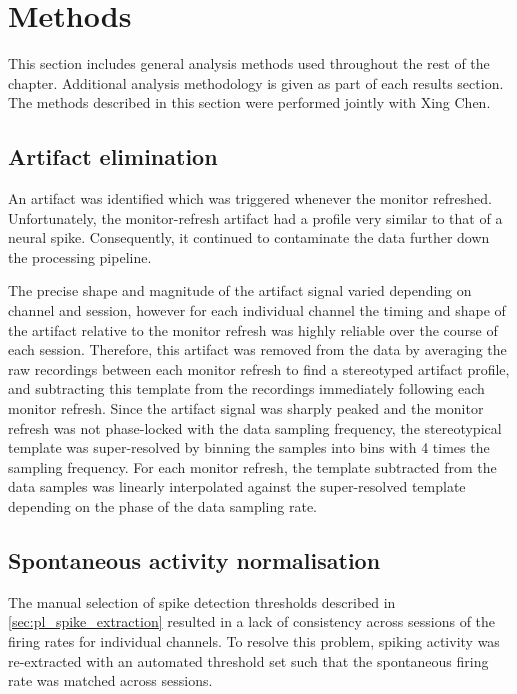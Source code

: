 \section{Methods}
\FloatBarrier

This section includes general analysis methods used throughout the rest of the chapter.
Additional analysis methodology is given as part of each results section.
The methods described in this section were performed jointly with Xing Chen.


\subsection{Artifact elimination}
\label{sec:pl_artifact_elimination}
\label{sec:ma}

An artifact was identified which was triggered whenever the monitor refreshed.
Unfortunately, the monitor-refresh artifact had a profile very similar to that of a neural spike.
Consequently, it continued to contaminate the data further down the processing pipeline.

The precise shape and magnitude of the artifact signal varied depending on channel and session, however for each individual channel the timing and shape of the artifact relative to the monitor refresh was highly reliable over the course of each session.
Therefore, this artifact was removed from the data by averaging the raw recordings between each monitor refresh to find a stereotyped artifact profile, and subtracting this template from the recordings immediately following each monitor refresh.
Since the artifact signal was sharply peaked and the monitor refresh was not phase-locked with the data sampling frequency, the stereotypical template was super-resolved by binning the samples into bins with 4 times the sampling frequency.
For each monitor refresh, the template subtracted from the data samples was linearly interpolated against the super-resolved template depending on the phase of the data sampling rate.


\subsection{Spontaneous activity normalisation}
\label{sec:pl_san}

The manual selection of spike detection thresholds described in \autoref{sec:pl_spike_extraction} resulted in a lack of consistency across sessions of the firing rates for individual channels.
To resolve this problem, spiking activity was re-extracted with an automated threshold set such that the spontaneous firing rate was matched across sessions.


